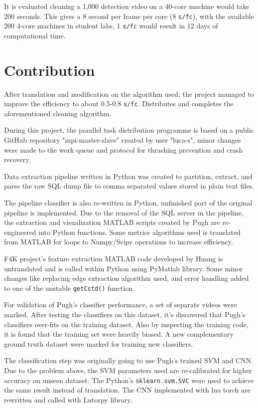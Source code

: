 \documentclass[bsc,logo,twoside,fullspacing,parskip]{infthesis}
\begin{document}
It is evaluated cleaning a 1,000 detection video on a 40-core machine would take 200 seconds.
This gives a 8 second per frame per core (8 {\tt s/fc}), with the available 200 4-core machines in student labs, 1 {\tt s/fc} would result in 12 days of computational time.

\section{Contribution}

After translation and modification on the algorithm used, the project managed to improve the efficiency to about 0.5-0.8 {\tt s/fc}. Distributes and completes the aforementioned cleaning algorithm.

During this project, the parallel task distribution programme is based on a public GitHub repository "mpi-master-slave" created by user "luca-s"\cite{L5}, minor changes were made to the work queue and protocol for thrashing prevention and crash recovery.

Data extraction pipeline written in Python was created to partition, extract, and parse the raw SQL dump file to comma separated values stored in plain text files. 

The pipeline classifier is also re-written in Python, unfinished part of the original pipeline is implemented. 
Due to the removal of the SQL server in the pipeline, the extraction and visualization MATLAB scripts created by Pugh are re-engineered into Python functions. 
Some metrics algorithms used is translated from MATLAB for loops to Numpy/Scipy operations to increase efficiency.

F4K project's feature extraction MATLAB code developed by Huang\cite{Huang} is untranslated and is called within Python using PyMatlab library. Some minor changes like replacing edge extraction algorithm used, and error handling added to one of the unstable {\tt getCstd()} function. 

For validation of Pugh's classifier performance, a set of separate videos were marked. After testing the classifiers on this dataset, it's discovered that Pugh's classifiers over-fits on the training dataset. Also by inspecting the training code, it is found that the training set were heavily biased. A new complementary ground truth dataset were marked for training new classifiers. 

The classification step was originally going to use Pugh's trained SVM and CNN. Due to the problem above, the SVM parameters used are re-calibrated for higher accuracy on unseen dataset. 
The Python's {\tt sklearn.svm.SVC} were used to achieve the same result instead of translation. The CNN implemented with lua torch are rewritten and called with Lutorpy library.
\end{document}
